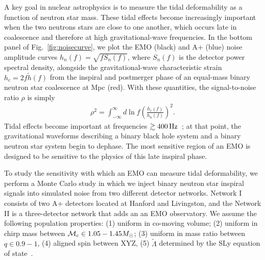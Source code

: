 \documentclass[prx,superscriptaddress,twocolumn,nopreprintnumbers,floatfix,nofootinbib]{revtex4}
\newcommand{\et}[1]{\textcolor{red}{[ET: #1]}}
\newcommand{\jvh}[1]{\textcolor{blue}{[JvH: #1]}}
\begin{document}
A key goal in nuclear astrophysics is to measure the tidal deformability as a function of neutron star mass.  
These tidal effects become increasingly important when the two neutrons stars are close to one another, which occurs late in coalescence and therefore at high gravitational-wave frequencies.
In the bottom panel of Fig.~\ref{fig:noisecurve}, we plot the EMO (black) and A+ (blue) noise amplitude curves $h_n(f)=\sqrt{fS_n(f)}$, where $S_n(f)$ is the detector power spectral density, alongside the gravitational-wave characteristic strain $h_c=2f\tilde{h}(f)$ from the inspiral and postmerger phase of an equal-mass binary neutron star coalescence at \unit[40]{Mpc} (red).  With these quantities, the signal-to-noise ratio $\rho$ is simply~\cite[e.g.,][]{moore15}
\begin{align}
    \rho^2=\int_{-\infty}^\infty d\ln f\left(\frac{h_c(f)}{h_{n}(f)}\right)^2.
\end{align}
Tidal effects become important at frequencies $\gtrsim\unit[400]{Hz}$~\cite{harry18}; at that point, the gravitational waveforms describing a binary black hole system and a binary neutron star system begin to dephase.  The most sensitive region of an EMO is designed to be sensitive to the physics of this late inspiral phase.



To study the sensitivity with which an EMO can measure tidal deformability, we perform a Monte Carlo study in which we inject binary neutron star inspiral signals into simulated noise from two different detector networks.
Network I consists of two A+ detectors located at Hanford and Livingston, and the Network II is a three-detector network that adds an an EMO observatory.
We assume the following population properties: (1) uniform in co-moving volume; (2) uniform in chirp mass between ${\cal M}_c \in 1.05-1.45 M_\odot$; (3) uniform in mass ratio between $q \in 0.9-1$, (4) aligned spin between XYZ, (5) $\tilde\Lambda$ determined by the SLy equation of state~\cite{douchin01}.
\end{document}

